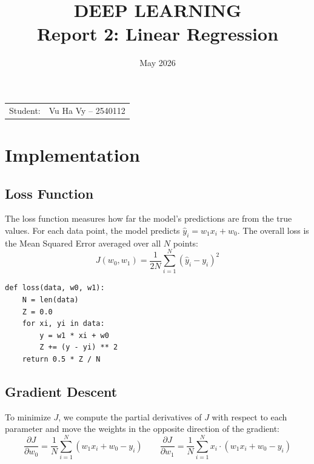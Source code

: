 \documentclass{article}
\title{\textbf{DEEP LEARNING} \\
{\Large \textbf{Report 2: Linear Regression}}}
\date{May 2026}
\begin{document}
\pagestyle{plain}
\maketitle

\noindent\begin{tabular}{@{}ll}
  Student: & Vu Ha Vy -- 2540112 \\
\end{tabular}

\section*{Implementation}

\subsection*{Loss Function}

The loss function measures how far the model's predictions are from the true
values. For each data point, the model predicts $\hat{y}_i = w_1 x_i + w_0$.
The overall loss is the Mean Squared Error averaged over all $N$ points:
\[
  J(w_0, w_1) = \frac{1}{2N} \sum_{i=1}^{N} (\hat{y}_i - y_i)^2
\]


\begin{verbatim}
def loss(data, w0, w1):
    N = len(data)
    Z = 0.0
    for xi, yi in data:
        y = w1 * xi + w0
        Z += (y - yi) ** 2
    return 0.5 * Z / N
\end{verbatim}

\subsection*{Gradient Descent}

To minimize $J$, we compute the partial derivatives of $J$ with respect to
each parameter and move the weights in the opposite direction of the gradient:
\[
  \frac{\partial J}{\partial w_0} = \frac{1}{N}\sum_{i=1}^{N}(w_1 x_i + w_0 - y_i)
  \qquad
  \frac{\partial J}{\partial w_1} = \frac{1}{N}\sum_{i=1}^{N} x_i \cdot (w_1 x_i + w_0 - y_i)
\]
\end{document}
